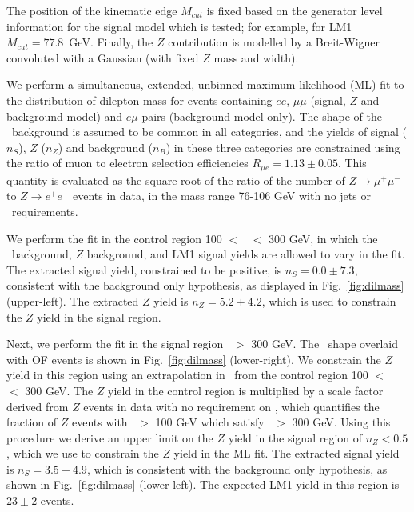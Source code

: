 The position of the kinematic edge $M_{cut}$ is fixed based on the generator level
information for the signal model which is tested; for example, for LM1 
$M_{cut} = 77.8$~GeV. Finally, the $Z$ contribution is modelled by a Breit-Wigner 
convoluted with a Gaussian (with fixed $Z$ mass and width). 

We perform a simultaneous, extended, unbinned maximum 
likelihood (ML) fit to the distribution of dilepton mass for events containing $ee$, $\mu\mu$ 
(signal, $Z$ and background model)
and $e\mu$ pairs (background model only). 
The shape of the \ttbar\ background is assumed to be common in all categories,
and the yields of signal ($n_S$), $Z$ ($n_Z$) and background ($n_B$) 
in these three categories are constrained using the ratio of muon to electron selection efficiencies
$R_{\mu e} = 1.13 \pm 0.05$. This quantity is evaluated as the square root of the ratio of the number of 
$Z \to \mu^+\mu^-$ to $Z \to e^+e^-$ events in data, in the mass range 76-106 GeV with no jets or 
\met\ requirements. 

We perform the fit in the control region 100 $<$ \Ht\ $<$ 300 GeV, in
which the \ttbar\ background, $Z$ background, and LM1 signal yields are allowed to vary in the fit. 
The extracted signal yield, constrained to be positive, is $n_S = 0.0 \pm 7.3$, 
consistent with the background only 
hypothesis, as displayed in Fig.~\ref{fig:dilmass} (upper-left). 
The extracted $Z$ yield is $n_Z = 5.2 \pm 4.2$, which is 
used to constrain the $Z$ yield in the signal region. 

Next, we perform the fit in the signal region \Ht\ $>$ 300 GeV. The \ttbar\ shape
overlaid with OF events is shown in Fig.~\ref{fig:dilmass} (lower-right). We
constrain the $Z$ yield in this region using an extrapolation in \Ht\ from the 
control region 100 $<$ \Ht\ $<$ 300 GeV. The $Z$ yield in the control region is
multiplied by a scale factor derived from $Z$ events in data with no requirement
on \MET, which quantifies the fraction of $Z$ events with \Ht\ $>$ 100 GeV which 
satisfy \Ht\ $>$ 300 GeV. Using this procedure we derive an upper limit on the
$Z$ yield in the signal region of $n_Z < 0.5$, which we use to constrain the
$Z$ yield in the ML fit. The extracted signal yield is $n_S = 3.5 \pm 4.9$,
which is consistent with the background only hypothesis,
as shown in Fig.~\ref{fig:dilmass} (lower-left). The expected LM1
yield in this region is $23\pm2 $ events.
